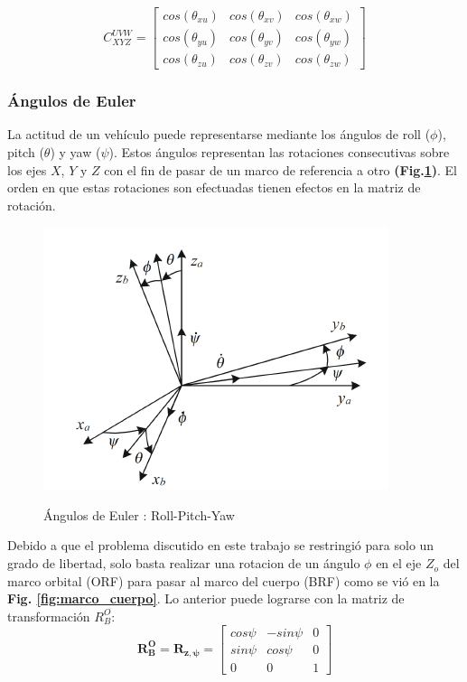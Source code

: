 $$
C_{XYZ}^{UVW} = \left[\begin{array}{ccc}
	cos\left(\theta_{xu}\right) &cos\left(\theta_{xv}\right) & cos\left(\theta_{xw}\right)\\
	cos\left(\theta_{yu}\right) &cos\left(\theta_{yv}\right) & cos\left(\theta_{yw}\right)\\
	cos\left(\theta_{zu}\right) &cos\left(\theta_{zv}\right) & cos\left(\theta_{zw}\right)
\end{array}\right]
$$
	

\subsubsection{Ángulos de Euler}
\hfill \break
La actitud de un vehículo puede representarse mediante los ángulos de roll ($\phi$), pitch ($\theta$) y yaw ($\psi$). Estos ángulos representan las rotaciones consecutivas sobre los ejes $X$, $Y$ y $Z$ con el fin de pasar de un marco de referencia a otro \textbf{(Fig.\ref{fig:angulosEuler})}. El orden en que estas rotaciones son efectuadas tienen efectos en la matriz de rotación.



\begin{figure}[!ht]
	\begin{center}
		\includegraphics[scale=0.8]{imagenes/marco_teorico/angulos_euler.PNG}\\
	\end{center}
	\caption{ Ángulos de Euler : Roll-Pitch-Yaw \cite{tes:Sorolla2019} }
	\label{fig:angulosEuler}
\end{figure}

 Debido a que el problema discutido en este trabajo se restringió para solo un grado de libertad, solo basta realizar una rotacion de un ángulo $\phi$ en el eje $Z_o$ del marco orbital (ORF) para pasar al marco del cuerpo (BRF) como se vió en la  \textbf{Fig. \ref{fig:marco_cuerpo}}. Lo anterior puede lograrse con la matriz de transformación $R_{B}^{O}$:
$$
\mathbf{R_{B}^{O}}=\mathbf{R_{z,\psi}}=\left[\begin{array}{ccc}
	cos\psi & -sin\psi & 0 \\
	sin\psi & cos\psi & 0 \\
	0 & 0 & 1
\end{array}\right]
$$


